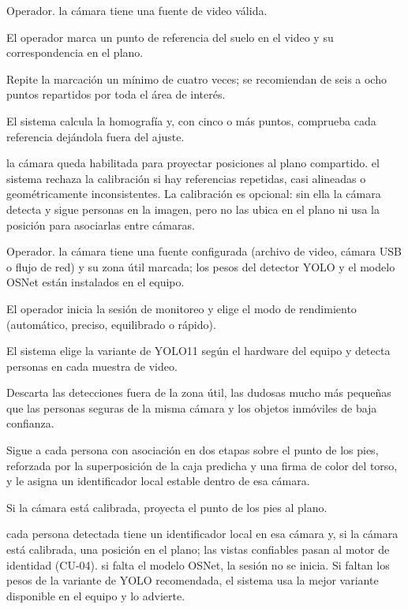   {Operador.}
  {la cámara tiene una fuente de video válida.}
  {\item El operador marca un punto de referencia del suelo en el video y su correspondencia en
         el plano.
   \item Repite la marcación un mínimo de cuatro veces; se recomiendan de seis a ocho puntos
         repartidos por toda el área de interés.
   \item El sistema calcula la homografía y, con cinco o más puntos, comprueba cada referencia
         dejándola fuera del ajuste.}
  {la cámara queda habilitada para proyectar posiciones al plano compartido.}
  {el sistema rechaza la calibración si hay referencias repetidas, casi alineadas o
   geométricamente inconsistentes. La calibración es opcional: sin ella la cámara detecta y sigue
   personas en la imagen, pero no las ubica en el plano ni usa la posición para asociarlas entre
   cámaras.}

  {Operador.}
  {la cámara tiene una fuente configurada (archivo de video, cámara USB o flujo de red) y su zona
   útil marcada; los pesos del detector YOLO y el modelo OSNet están instalados en el equipo.}
  {\item El operador inicia la sesión de monitoreo y elige el modo de rendimiento (automático,
         preciso, equilibrado o rápido).
   \item El sistema elige la variante de YOLO11 según el hardware del equipo y detecta personas en
         cada muestra de video.
   \item Descarta las detecciones fuera de la zona útil, las dudosas mucho más pequeñas que las
         personas seguras de la misma cámara y los objetos inmóviles de baja confianza.
   \item Sigue a cada persona con asociación en dos etapas sobre el punto de los pies, reforzada
         por la superposición de la caja predicha y una firma de color del torso, y le asigna un
         identificador local estable dentro de esa cámara.
   \item Si la cámara está calibrada, proyecta el punto de los pies al plano.}
  {cada persona detectada tiene un identificador local en esa cámara y, si la cámara está
   calibrada, una posición en el plano; las vistas confiables pasan al motor de identidad
   (CU-04).}
  {si falta el modelo OSNet, la sesión no se inicia. Si faltan los pesos de la variante de YOLO
   recomendada, el sistema usa la mejor variante disponible en el equipo y lo advierte.}

